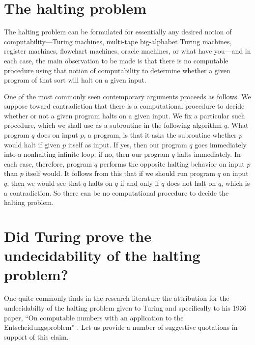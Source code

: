 \documentclass[12pt]{amsart}
\begin{document}
\section{The halting problem}\label{Section.Halting-problem}

The halting problem can be formulated for essentially any desired notion of computability---Turing machines, multi-tape big-alphabet Turing machines, register machines, flowchart machines, oracle machines, or what have you---and in each case, the main observation to be made is that there is no computable procedure using that notion of computability to determine whether a given program of that sort will halt on a given input.

One of the most commonly seen contemporary arguments proceeds as follows. We suppose toward contradiction that there is a computational procedure to decide whether or not a given program halts on a given input. We fix a particular such procedure, which we shall use as a subroutine in the following algorithm $q$. What program $q$ does on input $p$, a program, is that it asks the subroutine whether $p$ would halt if given $p$ itself as input. If yes, then our program $q$ goes immediately into a nonhalting infinite loop; if no, then our program $q$ halts immediately. In each case, therefore, program $q$ performs the opposite halting behavior on input $p$ than $p$ itself would. It follows from this that if we should run program $q$ on input $q$, then we would see that $q$ halts on $q$ if and only if $q$ does not halt on $q$, which is a contradiction. So there can be no computational procedure to decide the halting problem. 

\section{Did Turing prove the undecidability of the halting problem?}\label{Section.Quotes-giving-Turing-attribution}

One quite commonly finds in the research literature the attribution for the undecidabilty of the halting problem given to Turing and specifically to his 1936 paper, \enquote{On computable numbers with an application to the Entscheidungsproblem} \cite{Turing1936:On-computable-numbers}. Let us provide a number of suggestive quotations in support of this claim.

\bigskip
\end{document}
